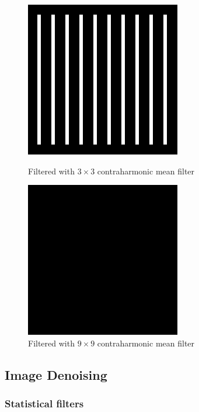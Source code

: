\documentclass{article}
\begin{document}
\begin{figure}[H]
	\captionsetup{justification=centering,margin=1cm}
	\begin{minipage}[b]{0.48\linewidth}
		\centering
		\includegraphics[width=192pt]{../result/task1/contraharmonic-mean-3-3.png}
		\caption{Filtered with $3 \times 3$ contraharmonic mean filter}
		\label{fig:barchm33}
	\end{minipage}
	\begin{minipage}[b]{0.48\linewidth}
		\centering
		\includegraphics[width=192pt]{../result/task1/contraharmonic-mean-9-9.png}
		\caption{Filtered with $9 \times 9$ contraharmonic mean filter}
		\label{fig:barchm99}
	\end{minipage}
\end{figure}



\subsection{Image Denoising}

\subsubsection{Statistical filters}
\end{document}
